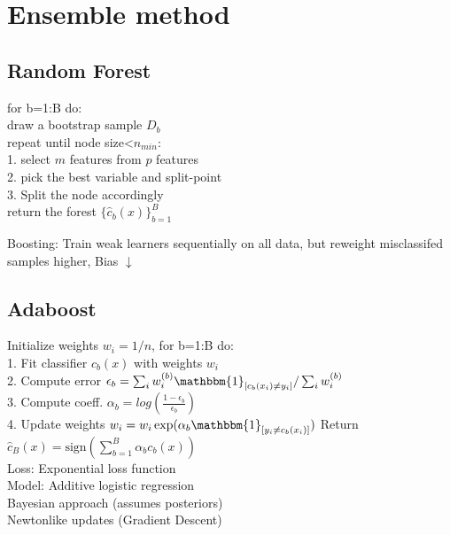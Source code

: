 \section{Ensemble method}
\subsection*{Random Forest}
for b=1:B do:\\
draw a bootstrap sample $D_b$\\
repeat until node size<$n_{min}$:\\
1. select $m$ features from $p$ features\\
2. pick the best variable and split-point\\
3. Split the node accordingly\\
return the forest $\{\hat{c}_b(x)\}_{b=1}^B$

Boosting: Train weak learners sequentially on all data, but reweight misclassifed samples higher, Bias $\downarrow$
\subsection*{Adaboost}
Initialize weights $w_i = 1/n$, for b=1:B do:\\
1. Fit classifier $c_b(x)$ with weights $w_i$\\
2. Compute error $\epsilon_b = \sum_i w_i^{(b)} \mathbbm{1}_{[c_b(x_i) \not = y_i]} / \sum_i w_i^{(b)}$\\
3. Compute coeff. $\alpha_b = log(\frac{1-\epsilon_b}{\epsilon_b})$\\
4. Update weights $w_i = w_i \exp(\alpha_b \mathbbm{1}_{[y_i \not = c_b(x_i)]})$
Return $\hat{c}_B(x) = \text{sign} \left ( \sum_{b=1}^B \alpha_b c_b(x) \right )$\\
Loss: Exponential loss function\\
Model: Additive logistic regression\\
Bayesian approach (assumes posteriors)\\
Newtonlike updates (Gradient Descent)


